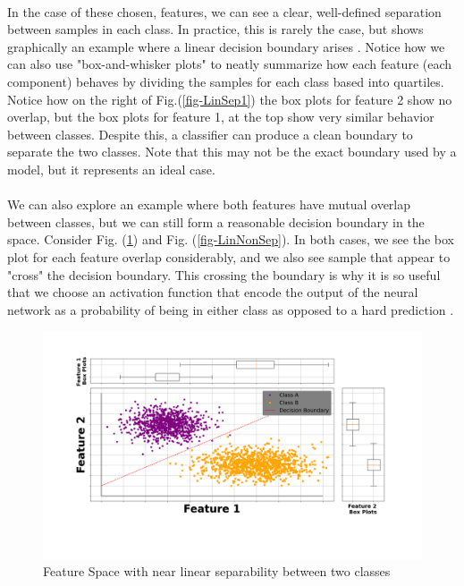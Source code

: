\documentclass[12pt,letterpaper]{article}
\begin{document}
\paragraph*{}In the case of these chosen, features, we can see a clear, well-defined separation between samples in each class. In practice, this is rarely the case, but shows graphically an example where a linear decision boundary arises \cite{James}. Notice how we can also use "box-and-whisker plots" to neatly summarize how each feature (each component) behaves by dividing the samples for each class based into quartiles. Notice how on the right of Fig.(\ref{fig-LinSep1}) the box plots for feature 2 show no overlap, but the box plots for feature 1, at the top show very similar behavior between classes. Despite this, a classifier can produce a clean boundary to separate the two classes. Note that this may not be the exact boundary used by a model, but it represents an ideal case.

\paragraph*{}We can also explore an example where both features have mutual overlap between classes, but we can still form a reasonable decision boundary in the space. Consider Fig. (\ref{fig-LinSep2}) and Fig. (\ref{fig-LinNonSep}). In both cases, we see the box plot for each feature overlap considerably, and we also see sample that appear to "cross" the decision boundary. This crossing the boundary is why it is so useful that we choose an activation function that encode the output of the neural network as a probability of being in either class as opposed to a hard prediction \cite{Loy,Geron}.

\begin{figure}[H]
\begin{center}
\includegraphics[scale=0.35]{../MakeFigures/LinearSeparable2}
\end{center}
\caption{Feature Space with near linear separability between two classes}
\label{fig-LinSep2}
\end{figure}
\end{document}
